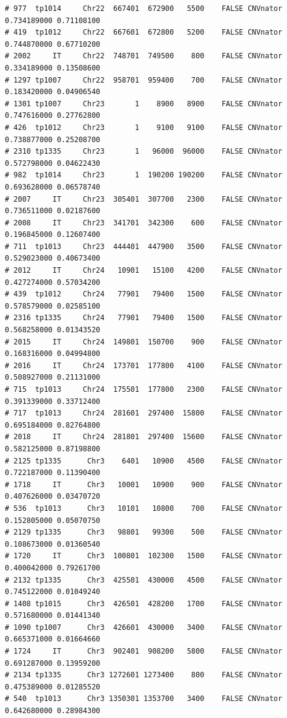 \documentclass{article}\usepackage[]{graphicx}\usepackage[]{color}
\makeatletter
\newenvironment{kframe}{%
 \def\at@end@of@kframe{}%
 \ifinner\ifhmode%
  \def\at@end@of@kframe{\end{minipage}}%
  \begin{minipage}{\columnwidth}%
 \fi\fi%
 \def\FrameCommand##1{\hskip\@totalleftmargin \hskip-\fboxsep
 \colorbox{shadecolor}{##1}\hskip-\fboxsep
     \hskip-\linewidth \hskip-\@totalleftmargin \hskip\columnwidth}%
 \MakeFramed {\advance\hsize-\width
   \@totalleftmargin\z@ \linewidth\hsize
   \@setminipage}}%
 {\par\unskip\endMakeFramed%
 \at@end@of@kframe}
\newenvironment{knitrout}{}{} %
\makeatother
\begin{document}
\begin{knitrout}
\begin{kframe}
\begin{verbatim}
# 977  tp1014     Chr22  667401  672900   5500    FALSE CNVnator 0.734189000 0.71108100
# 419  tp1012     Chr22  667601  672800   5200    FALSE CNVnator 0.744870000 0.67710200
# 2002     IT     Chr22  748701  749500    800    FALSE CNVnator 0.334189000 0.13508600
# 1297 tp1007     Chr22  958701  959400    700    FALSE CNVnator 0.183420000 0.04906540
# 1301 tp1007     Chr23       1    8900   8900    FALSE CNVnator 0.747616000 0.27762800
# 426  tp1012     Chr23       1    9100   9100    FALSE CNVnator 0.738877000 0.25208700
# 2310 tp1335     Chr23       1   96000  96000    FALSE CNVnator 0.572798000 0.04622430
# 982  tp1014     Chr23       1  190200 190200    FALSE CNVnator 0.693628000 0.06578740
# 2007     IT     Chr23  305401  307700   2300    FALSE CNVnator 0.736511000 0.02187600
# 2008     IT     Chr23  341701  342300    600    FALSE CNVnator 0.196845000 0.12607400
# 711  tp1013     Chr23  444401  447900   3500    FALSE CNVnator 0.529023000 0.40673400
# 2012     IT     Chr24   10901   15100   4200    FALSE CNVnator 0.427274000 0.57034200
# 439  tp1012     Chr24   77901   79400   1500    FALSE CNVnator 0.578579000 0.02585100
# 2316 tp1335     Chr24   77901   79400   1500    FALSE CNVnator 0.568258000 0.01343520
# 2015     IT     Chr24  149801  150700    900    FALSE CNVnator 0.168316000 0.04994800
# 2016     IT     Chr24  173701  177800   4100    FALSE CNVnator 0.508927000 0.21131000
# 715  tp1013     Chr24  175501  177800   2300    FALSE CNVnator 0.391339000 0.33712400
# 717  tp1013     Chr24  281601  297400  15800    FALSE CNVnator 0.695184000 0.82764800
# 2018     IT     Chr24  281801  297400  15600    FALSE CNVnator 0.582125000 0.87198800
# 2125 tp1335      Chr3    6401   10900   4500    FALSE CNVnator 0.722187000 0.11390400
# 1718     IT      Chr3   10001   10900    900    FALSE CNVnator 0.407626000 0.03470720
# 536  tp1013      Chr3   10101   10800    700    FALSE CNVnator 0.152805000 0.05070750
# 2129 tp1335      Chr3   98801   99300    500    FALSE CNVnator 0.108673000 0.01360540
# 1720     IT      Chr3  100801  102300   1500    FALSE CNVnator 0.400042000 0.79261700
# 2132 tp1335      Chr3  425501  430000   4500    FALSE CNVnator 0.745122000 0.01049240
# 1408 tp1015      Chr3  426501  428200   1700    FALSE CNVnator 0.571680000 0.01441340
# 1090 tp1007      Chr3  426601  430000   3400    FALSE CNVnator 0.665371000 0.01664660
# 1724     IT      Chr3  902401  908200   5800    FALSE CNVnator 0.691287000 0.13959200
# 2134 tp1335      Chr3 1272601 1273400    800    FALSE CNVnator 0.475389000 0.01285520
# 540  tp1013      Chr3 1350301 1353700   3400    FALSE CNVnator 0.642680000 0.28984300

\end{verbatim}
\end{kframe}
\end{knitrout}
\end{document}
